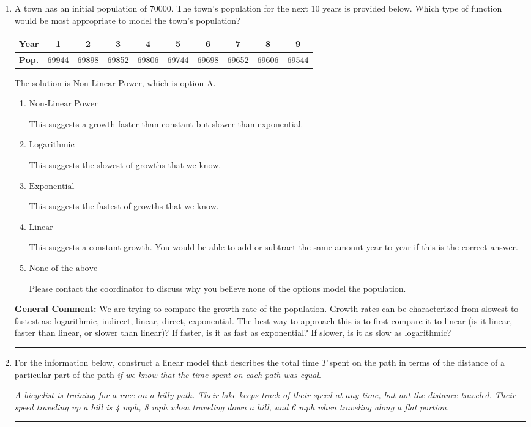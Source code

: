 \documentclass{extbook}[14pt]
\newcommand{\litem}[1]{\item #1

\rule{\textwidth}{0.4pt}}
\begin{document}
\begin{enumerate}\litem{
A town has an initial population of 70000. The town's population for the next 10 years is provided below. Which type of function would be most appropriate to model the town's population?



\begin{tabular}{c|c|c|c|c|c|c|c|c|c}
\textbf{Year} & 1 & 2 & 3 & 4 & 5 & 6 & 7 & 8 & 9 \tabularnewline
\hline
\textbf{Pop.} & 69944 & 69898 & 69852 & 69806 & 69744 & 69698 & 69652 & 69606 & 69544
\end{tabular} 

The solution is \( \text{Non-Linear Power} \), which is option A.\begin{enumerate}[label=\Alph*.]
\item \( \text{Non-Linear Power} \)

This suggests a growth faster than constant but slower than exponential.
\item \( \text{Logarithmic} \)

This suggests the slowest of growths that we know.
\item \( \text{Exponential} \)

This suggests the fastest of growths that we know.
\item \( \text{Linear} \)

This suggests a constant growth. You would be able to add or subtract the same amount year-to-year if this is the correct answer.
\item \( \text{None of the above} \)

Please contact the coordinator to discuss why you believe none of the options model the population.
\end{enumerate}

\textbf{General Comment:} We are trying to compare the growth rate of the population. Growth rates can be characterized from slowest to fastest as: logarithmic, indirect, linear, direct, exponential. The best way to approach this is to first compare it to linear (is it linear, faster than linear, or slower than linear)? If faster, is it as fast as exponential? If slower, is it as slow as logarithmic?
}
\litem{
For the information below, construct a linear model that describes the total time $T$ spent on the path in terms of the distance of a particular part of the path \textit{if we know that the time spent on each path was equal}.

\begin{center}
    \textit{ A bicyclist is training for a race on a hilly path. Their bike keeps track of their speed at any time, but not the distance traveled. Their speed traveling up a hill is 4 mph, 8 mph when traveling down a hill, and 6 mph when traveling along a flat portion. }
\end{center}


}
\end{enumerate}
\end{document}
